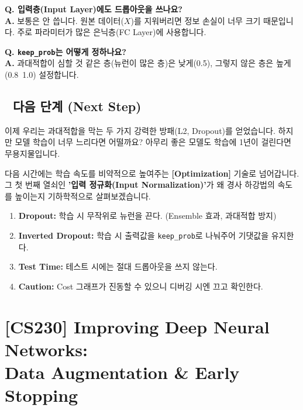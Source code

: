 \documentclass[11pt,a4paper]{book}
\theoremstyle{definition}
\begin{document}
\textbf{Q. 입력층(Input Layer)에도 드롭아웃을 쓰나요?} \\
\textbf{A.} 보통은 안 씁니다. 원본 데이터($X$)를 지워버리면 정보 손실이 너무 크기 때문입니다. 주로 파라미터가 많은 은닉층(FC Layer)에 사용합니다.

\textbf{Q. \texttt{keep\_prob}는 어떻게 정하나요?} \\
\textbf{A.} 과대적합이 심할 것 같은 층(뉴런이 많은 층)은 낮게(0.5), 그렇지 않은 층은 높게(0.8~1.0) 설정합니다.

\section*{🔗 다음 단계 (Next Step)}
이제 우리는 과대적합을 막는 두 가지 강력한 방패(L2, Dropout)를 얻었습니다. 
하지만 모델 학습이 너무 느리다면 어떨까요? 아무리 좋은 모델도 학습에 1년이 걸린다면 무용지물입니다.

다음 시간에는 학습 속도를 비약적으로 높여주는 \textbf{[Optimization]} 기술로 넘어갑니다. 그 첫 번째 열쇠인 \textbf{'입력 정규화(Input Normalization)'}가 왜 경사 하강법의 속도를 높이는지 기하학적으로 살펴보겠습니다.

\vspace{0.5cm}

\begin{summarybox}[title={단원 요약 (Cheat Sheet)}]
\begin{enumerate}
    \item \textbf{Dropout:} 학습 시 무작위로 뉴런을 끈다. (Ensemble 효과, 과대적합 방지)
    \item \textbf{Inverted Dropout:} 학습 시 출력값을 \texttt{keep\_prob}로 나눠주어 기댓값을 유지한다.
    \item \textbf{Test Time:} 테스트 시에는 절대 드롭아웃을 쓰지 않는다.
    \item \textbf{Caution:} Cost 그래프가 진동할 수 있으니 디버깅 시엔 끄고 확인한다.
\end{enumerate}
\end{summarybox}


\chapter{[CS230] Improving Deep Neural Networks: \\ Data Augmentation \& Early Stopping}
\label{ch:lecture15}
\end{document}
